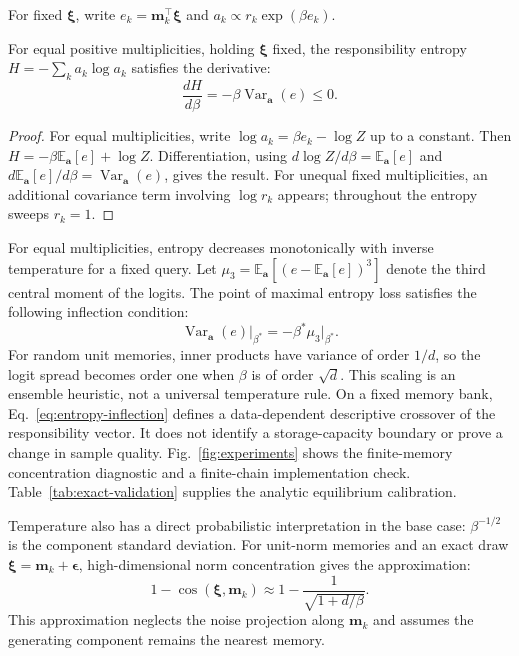 For fixed $\boldsymbol\xi$, write $e_k=\mathbf m_k^\top\boldsymbol\xi$ and
$a_k\propto r_k\exp(\beta e_k)$.

\begin{proposition}
\label{prop:entropy-derivative}
For equal positive multiplicities, holding $\boldsymbol\xi$ fixed, the
responsibility entropy $H=-\sum_k a_k\log a_k$ satisfies the derivative:
\begin{equation}
\frac{dH}{d\beta}=-\beta\operatorname{Var}_{\mathbf a}(e)\leq0.
\label{eq:entropy-derivative}
\end{equation}
\end{proposition}

\begin{proof}
For equal multiplicities, write $\log a_k=\beta e_k-\log Z$ up to a
constant. Then $H=-\beta\mathbb E_{\mathbf a}[e]+\log Z$. Differentiation,
using $d\log Z/d\beta=\mathbb E_{\mathbf a}[e]$ and
$d\mathbb E_{\mathbf a}[e]/d\beta=\operatorname{Var}_{\mathbf a}(e)$, gives
the result. For unequal fixed multiplicities, an additional covariance term
involving $\log r_k$ appears; throughout the entropy sweeps $r_k=1$.
\end{proof}

For equal multiplicities, entropy decreases monotonically with inverse
temperature for a fixed query. Let
$\mu_3=\mathbb E_{\mathbf a}[(e-\mathbb E_{\mathbf a}[e])^3]$ denote the third
central moment of the logits. The point of maximal entropy loss satisfies the
following inflection condition:
\begin{equation}
\operatorname{Var}_{\mathbf a}(e)\big|_{\beta^*}
=-\beta^*\mu_3\big|_{\beta^*}.
\label{eq:entropy-inflection}
\end{equation}
For random unit memories, inner products have variance of order $1/d$, so the
logit spread becomes order one when $\beta$ is of order $\sqrt d$. This scaling
is an ensemble heuristic, not a universal temperature rule. On a fixed memory
bank, Eq.~\eqref{eq:entropy-inflection} defines a data-dependent descriptive
crossover of the responsibility vector. It does not identify a storage-capacity
boundary or prove a change in sample quality. Fig.~\ref{fig:experiments}
shows the finite-memory concentration diagnostic and a finite-chain
implementation check. Table~\ref{tab:exact-validation} supplies the analytic
equilibrium calibration.

Temperature also has a direct probabilistic interpretation in the base case:
$\beta^{-1/2}$ is the component standard deviation. For unit-norm memories and
an exact draw $\boldsymbol\xi=\mathbf m_k+\boldsymbol\epsilon$, high-dimensional
norm concentration gives the approximation:
\begin{equation}
1-\cos(\boldsymbol\xi,\mathbf m_k)
\approx 1-\frac{1}{\sqrt{1+d/\beta}}.
\label{eq:novelty-approximation}
\end{equation}
This approximation neglects the noise projection along $\mathbf m_k$ and
assumes the generating component remains the nearest memory.

